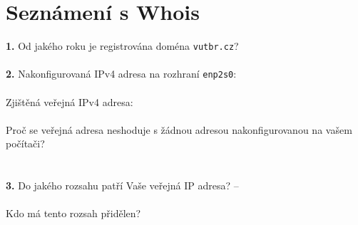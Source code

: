 \section{Seznámení s Whois}
\textbf{1.} Od jakého roku je registrována doména {\tt vutbr.cz}?
\underline{\hspace{2cm}}
\\
\\
\textbf{2.} Nakonfigurovaná IPv4 adresa na rozhraní \texttt{enp2s0}: 
\underline{\hspace{3.8cm}}
\\
\\
\hspace*{0.5cm} Zjištěná veřejná IPv4 adresa: \underline{\hspace{3.8cm}}
\\
\\
\hspace*{0.5cm} Proč se veřejná adresa neshoduje s žádnou adresou nakonfigurovanou na vašem počítači?
\\
\\
\\
\textbf{3.} Do jakého rozsahu patří Vaše veřejná IP adresa?
\underline{\hspace{3.8cm}} -- \underline{\hspace{3.8cm}}
\\
\\
\hspace*{0.5cm}Kdo má tento rozsah přidělen?\hspace*{0.2cm}\underline{\hspace{3.8cm}}
\newpage
